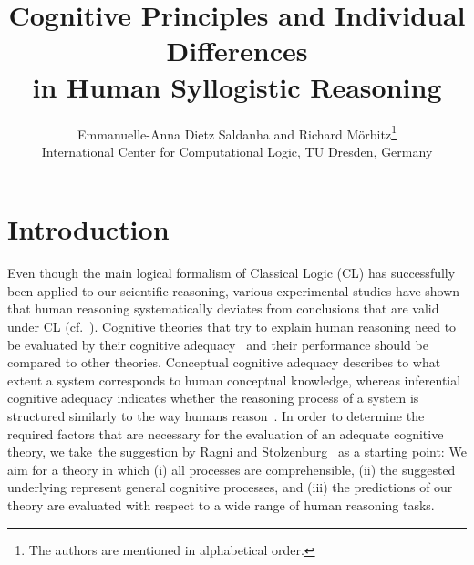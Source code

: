 \documentclass[12pt]{article}
\title{Cognitive Principles and Individual Differences \\ in Human Syllogistic Reasoning}
\author{
Emmanuelle-Anna Dietz Saldanha and Richard M{\"o}rbitz\thanks{The authors are mentioned in alphabetical order.} \\
\normalsize International Center for Computational Logic, TU
  Dresden, Germany
}
\date{}
\begin{document}
\maketitle

\section{Introduction}
% 
% 

Even though the main logical formalism of Classical Logic (CL) has successfully been applied to our scientific reasoning,
various experimental studies have shown that human reasoning systematically deviates 
from conclusions that are valid under CL (cf.~\cite{wason:68,byrne:89}).
Cognitive theories that try to explain human reasoning need to be evaluated by their cognitive adequacy~\cite{strube:1992} and their performance should be compared to other theories.
Conceptual cognitive adequacy describes to what extent a system corresponds to human conceptual knowledge, whereas inferential cognitive adequacy indicates whether the reasoning process of a system is structured similarly to the way humans reason~\cite{knauff:rauh:renz:1997}. 
In order to determine the required factors that are necessary for the evaluation of an adequate cognitive theory, we take~the suggestion by Ragni and Stolzenburg~\cite{ragni:stolzenburg:2015} as a starting point:
We aim for a theory in which (i) all processes are comprehensible, (ii) the suggested underlying represent general cognitive processes, and (iii) the predictions of our theory are evaluated with respect to a wide range of human reasoning tasks. 
\end{document}
